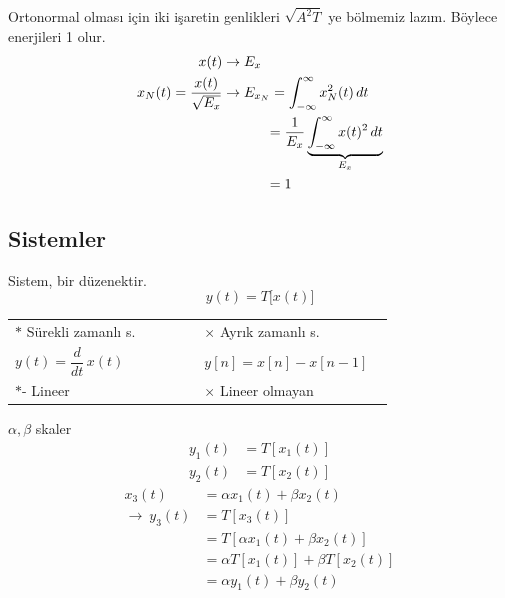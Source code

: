 \documentclass[11pt,a4paper]{article}
\begin{document}
Ortonormal olması için iki işaretin genlikleri $\sqrt{A^2T}$ ye bölmemiz lazım. Böylece enerjileri 1 olur.
\begin{align*}
x(t) &\to E_x \\
x_N(t)=\frac{x(t)}{\sqrt{E_x}} &\to E_{x_N}=\int_{-\infty}^{\infty}x_N^2(t)\,dt \\
&\hspace{1.1cm}=\frac{1}{E_x}\underbrace{\int_{-\infty}^{\infty}x(t)^2\,dt}_{E_x} \\
&\hspace{1.1cm}=1
\end{align*}

\subsection{Sistemler}
Sistem, bir düzenektir.
\[ y(t)=T\bigl[x(t)\bigr] \]
\begin{center}
\end{center}

\noindent
\begin{tabular}{@{}p{0.47\linewidth}p{0.47\linewidth}@{}}
  \textcolor{kirmizikalem}{$\ast$} Sürekli zamanlı s. & $\times$ Ayrık zamanlı s. \\[1mm]
  \quad $y(t)=\dfrac{d}{dt}\,x(t)$ & \quad $y[n]=x[n]-x[n-1]$ \\[5mm]
  \textcolor{kirmizikalem}{$\ast$}- Lineer & $\times$ Lineer olmayan
\end{tabular}

$\alpha,\beta$ skaler
\begin{align*}
y_1(t) &= T[x_1(t)] \\
y_2(t) &= T[x_2(t)]
\end{align*}
\begin{align*}
x_3(t) &= \alpha x_1(t)+\beta x_2(t) \\
\to\ y_3(t) &= T[x_3(t)] \\
&= T[\alpha x_1(t)+\beta x_2(t)] \\
&= \alpha T[x_1(t)]+\beta T[x_2(t)] \\
&= \alpha y_1(t)+\beta y_2(t)
\end{align*}
\end{document}
